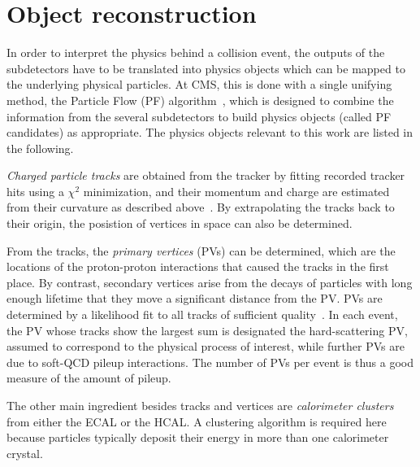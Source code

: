 \section{Object reconstruction}
\label{sec:methods:reco}

In order to interpret the physics behind a collision event, the outputs of the subdetectors have to be translated into physics objects which can be mapped to the underlying physical particles. At CMS, this is done with a single unifying method, the Particle Flow (PF) algorithm~\cite{CMS:PRF-14-001}, which is designed to combine the information from the several subdetectors to build physics objects (called PF candidates) as appropriate. The physics objects relevant to this work are listed in the following.

\textit{Charged particle tracks} are obtained from the tracker by fitting recorded tracker hits using a $\chi^2$ minimization, and their momentum and charge are estimated from their curvature as described above~\cite{CMS:2014pgm}. 
By extrapolating the tracks back to their origin, the posistion of vertices in space can also be determined. 
    
From the tracks, the \textit{primary vertices} (PVs) can be determined, which are the locations of the proton-proton interactions that caused the tracks in the first place. By contrast, secondary vertices arise from the decays of particles with long enough lifetime that they move a significant distance from the PV. PVs are determined by a likelihood fit to all tracks of sufficient quality~\cite{CMS:2014pgm}. In each event, the PV whose tracks show the largest \pt sum is designated the hard-scattering PV, assumed to correspond to the physical process of interest, while further PVs are due to soft-QCD pileup interactions. The number of PVs per event is thus a good measure of the amount of pileup.
    
The other main ingredient besides tracks and vertices are \textit{calorimeter clusters} from either the ECAL or the HCAL. A clustering algorithm is required here because particles typically deposit their energy in more than one calorimeter crystal.

